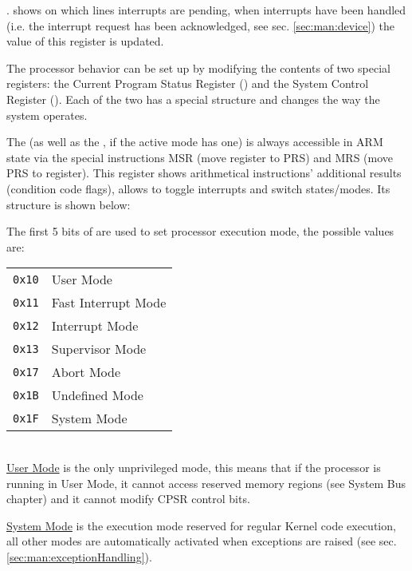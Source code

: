 . shows on which lines interrupts are pending, when interrupts have been handled (i.e. the interrupt request has been acknowledged, see sec. \ref{sec:man:device}) the value of this register is updated.


The processor behavior can be set up by modifying the contents of two special registers: the Current Program Status Register () and the System Control Register ().
Each of the two has a special structure and changes the way the system operates.


The  (as well as the , if the active mode has one) is always accessible in ARM state via the special instructions MSR (move register to PRS) and MRS (move PRS to register). This register shows arithmetical instructions' additional results (condition code flags), allows to toggle interrupts and switch states/modes. Its structure is shown below:




The first 5 bits of  are used to set processor execution mode, the possible values are:
\\

\begin{tabular}{r|l}
\texttt{0x10} & User Mode \\
\texttt{0x11} & Fast Interrupt Mode \\
\texttt{0x12} & Interrupt Mode \\
\texttt{0x13} & Supervisor Mode \\
\texttt{0x17} & Abort Mode \\
\texttt{0x1B} & Undefined Mode \\
\texttt{0x1F} & System Mode \\
\end{tabular}
\\

\uline{User Mode} is the only unprivileged mode, this means that if the processor is running in User Mode, it cannot access reserved memory regions (see System Bus chapter) and it cannot modify CPSR control bits.

\uline{System Mode} is the execution mode reserved for regular Kernel code execution, all other modes are automatically activated when exceptions are raised (see sec. \ref{sec:man:exceptionHandling}).

